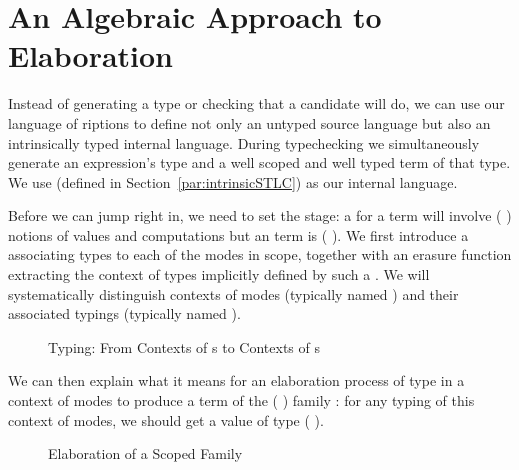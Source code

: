 \section{An Algebraic Approach to Elaboration}\label{section:elaboration}

Instead of generating a type or checking that a candidate will do, we
can use our language of riptions to define not only an
untyped source language but also an intrinsically typed internal
language. During typechecking we simultaneously generate an
expression's type and a well scoped and well typed term of that
type. We use  (defined in Section~\ref{par:intrinsicSTLC}) as
our internal language.

Before we can jump right in, we need to set the stage: a  for a
 term will involve ({ }) notions of values and
computations but an  term is ({ }). We first
introduce a  associating types to each of the modes in scope,
together with an erasure function  extracting the context of types
implicitly defined by such a .
%
We will systematically distinguish contexts of modes (typically named )
and their associated typings (typically named ).

\begin{figure}[h]
\begin{minipage}[t]{0.4\textwidth}
\end{minipage}
\begin{minipage}[t]{0.5\textwidth}
\end{minipage}
\caption{Typing: From Contexts of s to Contexts of s\label{fig:typingmodes}}
\end{figure}

We can then explain what it means for an elaboration process of type 
in a context of modes  to produce a term of the
({ }) family : for any typing  of this
context of modes, we should get a value of type
{(    )}.

\begin{figure}[h]
\caption{Elaboration of a Scoped Family}
\end{figure}

